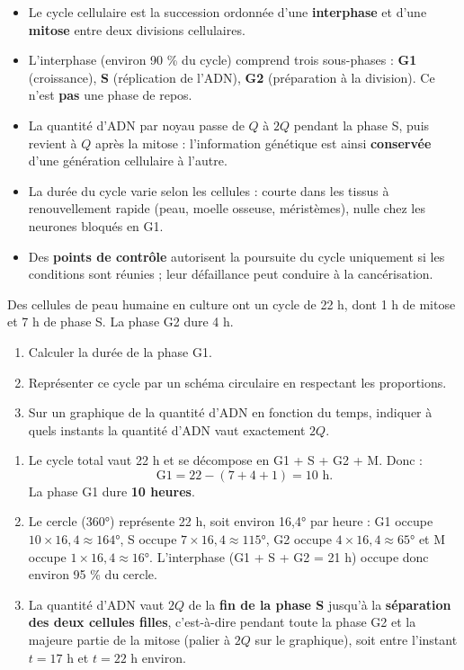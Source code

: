 \documentclass[11pt]{article}
\newcommand{\cle}[1]{{\popxbold\color{popdark}#1}}
\begin{document}
\begin{aretenir}
\begin{itemize}
\item Le \cle{cycle cellulaire} est la succession ordonnée d'une \textbf{interphase} et d'une \textbf{mitose} entre deux divisions cellulaires.
\item L'interphase (environ 90 \% du cycle) comprend trois sous-phases : \textbf{G1} (croissance), \textbf{S} (réplication de l'ADN), \textbf{G2} (préparation à la division). Ce n'est \textbf{pas} une phase de repos.
\item La quantité d'ADN par noyau passe de $Q$ à $2Q$ pendant la phase S, puis revient à $Q$ après la mitose : l'information génétique est ainsi \textbf{conservée} d'une génération cellulaire à l'autre.
\item La durée du cycle varie selon les cellules : courte dans les tissus à renouvellement rapide (peau, moelle osseuse, méristèmes), nulle chez les neurones bloqués en G1.
\item Des \textbf{points de contrôle} autorisent la poursuite du cycle uniquement si les conditions sont réunies ; leur défaillance peut conduire à la cancérisation.
\end{itemize}
\end{aretenir}

\begin{exercice}
Des cellules de peau humaine en culture ont un cycle de 22 h, dont 1 h de mitose et 7 h de phase S. La phase G2 dure 4 h.
\begin{enumerate}
\item Calculer la durée de la phase G1.
\item Représenter ce cycle par un schéma circulaire en respectant les proportions.
\item Sur un graphique de la quantité d'ADN en fonction du temps, indiquer à quels instants la quantité d'ADN vaut exactement $2Q$.
\end{enumerate}
\end{exercice}

\begin{corrige}
\begin{enumerate}
\item Le cycle total vaut 22 h et se décompose en G1 + S + G2 + M. Donc :
\[ \text{G1} = 22 - (7 + 4 + 1) = 10 \text{ h}. \]
La phase G1 dure \textbf{10 heures}.
\item Le cercle (360°) représente 22 h, soit environ 16,4° par heure : G1 occupe $10 \times 16{,}4 \approx 164°$, S occupe $7 \times 16{,}4 \approx 115°$, G2 occupe $4 \times 16{,}4 \approx 65°$ et M occupe $1 \times 16{,}4 \approx 16°$. L'interphase (G1 + S + G2 = 21 h) occupe donc environ 95 \% du cercle.
\item La quantité d'ADN vaut $2Q$ de la \textbf{fin de la phase S} jusqu'à la \textbf{séparation des deux cellules filles}, c'est-à-dire pendant toute la phase G2 et la majeure partie de la mitose (palier à $2Q$ sur le graphique), soit entre l'instant $t = 17$ h et $t = 22$ h environ.
\end{enumerate}
\end{corrige}
\end{document}
